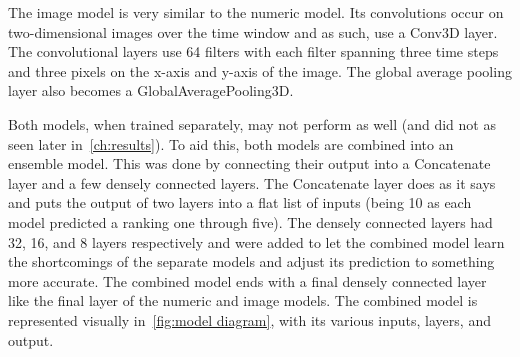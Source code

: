The image model is very similar to the numeric model.
Its convolutions occur on two-dimensional images over the time window and as such, use a Conv3D layer.
The convolutional layers use 64 filters with each filter spanning three time steps and three pixels on the x-axis and y-axis of the image.
The global average pooling layer also becomes a GlobalAveragePooling3D\@.

Both models, when trained separately, may not perform as well (and did not as seen later in~\ref{ch:results}).
To aid this, both models are combined into an ensemble model.
This was done by connecting their output into a Concatenate layer and a few densely connected layers.
The Concatenate layer does as it says and puts the output of two layers into a flat list of inputs (being 10 as each model predicted a ranking one through five).
The densely connected layers had 32, 16, and 8 layers respectively and were added to let the combined model learn the shortcomings of the separate models and adjust its prediction to something more accurate.
The combined model ends with a final densely connected layer like the final layer of the numeric and image models.
The combined model is represented visually in~\ref{fig:model diagram}, with its various inputs, layers, and output.

